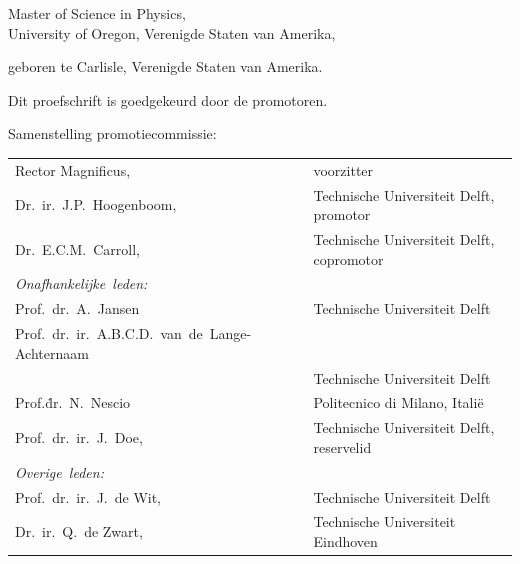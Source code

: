 \begin{titlepage}
\begin{center}
\bigskip
\bigskip

Master of Science in Physics, \\
University of Oregon, Verenigde Staten van Amerika,

geboren te Carlisle, Verenigde Staten van Amerika.

\vspace*{2\bigskipamount}

\end{center}

\clearpage
\thispagestyle{empty}

\noindent Dit proefschrift is goedgekeurd door de promotoren.


\bigskip
\noindent Samenstelling promotiecommissie:

\medskip\noindent
\begin{tabular}{p{4cm}l}
    Rector Magnificus, & voorzitter \\
    Dr.\ ir.\ J.P.\ Hoogenboom, & Technische Universiteit Delft, promotor \\
    Dr.\ E.C.M.\ Carroll, & Technische Universiteit Delft, copromotor \\

    \medskip
    \mbox{\emph{Onafhankelijke leden:}} & \\

    Prof.\ dr.\ A.\ Jansen & Technische Universiteit Delft \\
    \mbox{Prof.\ dr.\ ir.\ A.B.C.D.\ van de Lange-Achternaam} & \\
      & Technische Universiteit Delft \\
    Prof.\.dr.\ N.\ Nescio & Politecnico di Milano, Itali\"e \\
    Prof.\ dr.\ ir.\ J.\ Doe, & Technische Universiteit Delft, reservelid \\

    \medskip
    \mbox{\emph{Overige leden:}} & \\
    Prof.\ dr.\ ir.\ J.\ de Wit, & Technische Universiteit Delft \\
    Dr.\ ir.\ Q.\ de Zwart, & Technische Universiteit Eindhoven \\
\end{tabular}


\end{titlepage}
